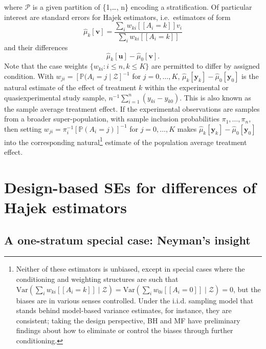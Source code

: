 where \(\mathcal{P}\) is a given partition of \{1,\ldots{}, n\} encoding
a stratification. Of particular interest are standard errors for Hajek
estimators, i.e.~estimators of form
\[\hat{\mu}_k[\mathbf{v}] = \frac{\sum_i w_{ki} [\![A_i=k]\!] v_i}{\sum_i w_{ki}  [\![A_i=k]\!]}\]
and their differences
\begin{equation}\label{eq:hajekdiff}
\hat{\mu}_k[\mathbf{u}] - \hat{\mu}_0[\mathbf{v}].
\end{equation}
Note that the case weights $\{w_{ki}:i\leq n, k\leq K\}$ are permitted
to differ by assigned condition.
With $w_{ji} =[\mathbb{P}(A_{i}=j \mid \mathcal{Z}]^{-1}$ for
$j=0, \ldots, K$,
$\hat{\mu}_k[\mathbf{y}_{k}] - \hat{\mu}_0[\mathbf{y}_{0}]$ is the
natural estimate of the effect of treatment $k$ within the
experimental or quasiexperimental study sample,
$n^{-1}\sum_{i=1}^{n}(y_{ki}-y_{k0})$.  This is also known as the
sample average treatment effect. If the experimental observations are
samples from a broader super-population, with sample inclusion
probabilities $\pi_{1}, \ldots, \pi_{n}$, then setting
$w_{ji} =\pi_{i}^{-1}[\mathbb{P}(A_{i}=j)]^{-1}$ for $j=0, \ldots, K$
makes $\hat{\mu}_k[\mathbf{y}_{k}] - \hat{\mu}_0[\mathbf{y}_{0}]$ into
the corresponding natural\footnote{Neither of these estimators is unbiased, except in special
cases where the conditioning and weighting structures are such that
$\mathrm{Var}(\sum_i w_{ki} [\![A_i=k]\!] \mid \mathcal{Z}) = \mathrm{Var}(\sum_i
w_{0i} [\![A_i=0]\!] \mid \mathcal{Z}) = 0$, but the biases are
in various senses controlled. Under the i.i.d. sampling model that
stands behind model-based variance estimates, for instance, they are
consistent; taking the design perspective, BH and MF have preliminary
findings about how to eliminate or control the biases through further
conditioning.} estimate of the population average treatment
effect.

\section*{Design-based SEs for differences of Hajek estimators}
\subsection*{A one-stratum special case: Neyman's insight}

